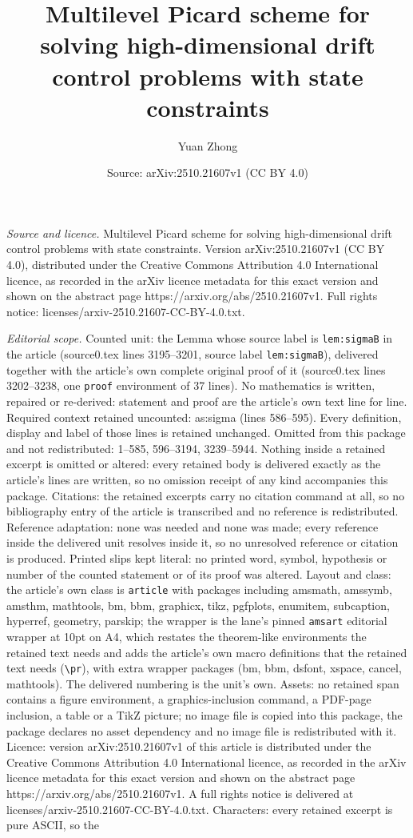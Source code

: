 \documentclass[10pt,a4paper]{amsart}
\title[Multilevel Picard scheme for solving high-dimensional drift ]{Multilevel Picard scheme for solving high-dimensional drift control problems with state constraints}
\author{Yuan Zhong}
\date{Source: arXiv:2510.21607v1 (CC BY 4.0)}
\begin{document}
\maketitle

\noindent\emph{Source and licence.} Multilevel Picard scheme for solving high-dimensional drift control problems with state constraints. Version arXiv:2510.21607v1 (CC BY 4.0), distributed under the Creative Commons Attribution 4.0 International licence, as recorded in the arXiv licence metadata for this exact version and shown on the abstract page https://arxiv.org/abs/2510.21607v1. Full rights notice: licenses/arxiv-2510.21607-CC-BY-4.0.txt.\par\smallskip

\noindent\textit{Editorial scope.} Counted unit: the Lemma whose source label is \texttt{lem:sigmaB} in the article (source0.tex lines 3195--3201, source label \texttt{lem:sigmaB}), delivered together with the article's own complete original proof of it (source0.tex lines 3202--3238, one \texttt{proof} environment of 37 lines). No mathematics is written, repaired or re-derived: statement and proof are the article's own text line for line. Required context retained uncounted: as:sigma (lines 586--595). Every definition, display and label of those lines is retained unchanged. Omitted from this package and not redistributed: 1--585, 596--3194, 3239--5944. Nothing inside a retained excerpt is omitted or altered: every retained body is delivered exactly as the article's lines are written, so no omission receipt of any kind accompanies this package. Citations: the retained excerpts carry no citation command at all, so no bibliography entry of the article is transcribed and no reference is redistributed. Reference adaptation: none was needed and none was made; every reference inside the delivered unit resolves inside it, so no unresolved reference or citation is produced. Printed slips kept literal: no printed word, symbol, hypothesis or number of the counted statement or of its proof was altered. Layout and class: the article's own class is \texttt{article} with packages including amsmath, amssymb, amsthm, mathtools, bm, bbm, graphicx, tikz, pgfplots, enumitem, subcaption, hyperref, geometry, parskip; the wrapper is the lane's pinned \texttt{amsart} editorial wrapper at 10pt on A4, which restates the theorem-like environments the retained text needs and adds the article's own macro definitions that the retained text needs (\texttt{\textbackslash pr}), with extra wrapper packages (bm, bbm, dsfont, xspace, cancel, mathtools). The delivered numbering is the unit's own. Assets: no retained span contains a figure environment, a graphics-inclusion command, a PDF-page inclusion, a table or a TikZ picture; no image file is copied into this package, the package declares no asset dependency and no image file is redistributed with it. Licence: version arXiv:2510.21607v1 of this article is distributed under the Creative Commons Attribution 4.0 International licence, as recorded in the arXiv licence metadata for this exact version and shown on the abstract page https://arxiv.org/abs/2510.21607v1. A full rights notice is delivered at licenses/arxiv-2510.21607-CC-BY-4.0.txt. Characters: every retained excerpt is pure ASCII, so the 
\end{document}
